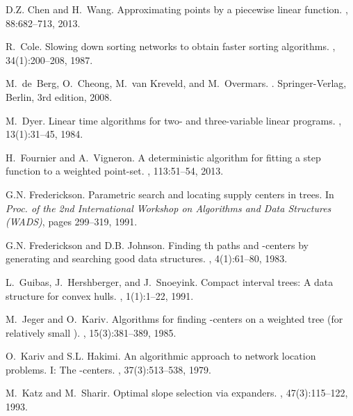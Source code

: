 \documentclass{llncs}
\begin{document}
\begin{thebibliography}{10}
D.Z. Chen and H.~Wang.
\newblock Approximating points by a piecewise linear function.
, 88:682--713, 2013.

R.~Cole.
\newblock Slowing down sorting networks to obtain faster sorting algorithms.
, 34(1):200--208, 1987.

M.~de~Berg, O.~Cheong, M.~van Kreveld, and M.~Overmars.
.
\newblock Springer-Verlag, Berlin, 3rd edition, 2008.

M.~Dyer.
\newblock Linear time algorithms for two- and three-variable linear programs.
, 13(1):31--45, 1984.

H.~Fournier and A.~Vigneron.
\newblock A deterministic algorithm for fitting a step function to a weighted
  point-set.
, 113:51--54, 2013.

G.N. Frederickson.
\newblock Parametric search and locating supply centers in trees.
\newblock In {\em Proc. of the 2nd International Workshop on Algorithms and
  Data Structures (WADS)}, pages 299--319, 1991.

G.N. Frederickson and D.B. Johnson.
\newblock Finding {th} paths and {-centers} by generating and searching
  good data structures.
, 4(1):61--80, 1983.

L.~Guibas, J.~Hershberger, and J.~Snoeyink.
\newblock Compact interval trees: A data structure for convex hulls.
, 1(1):1--22, 1991.

M.~Jeger and O.~Kariv.
\newblock Algorithms for finding {-centers} on a weighted tree (for
  relatively small {}).
, 15(3):381--389, 1985.

O.~Kariv and S.L. Hakimi.
\newblock An algorithmic approach to network location problems. {I: The}
  -centers.
, 37(3):513--538, 1979.

M.~Katz and M.~Sharir.
\newblock Optimal slope selection via expanders.
, 47(3):115--122, 1993.


\end{thebibliography}
\end{document}
